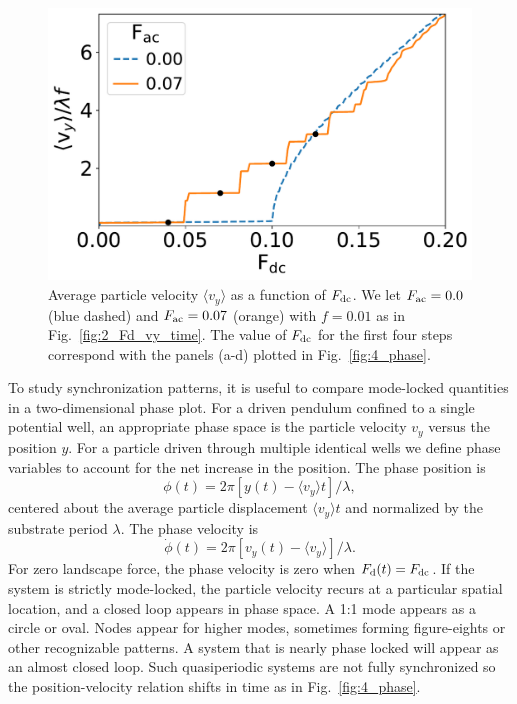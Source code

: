 \documentclass[preprint,showpacs,preprintnumbers,amsmath,amssymb,aps,prb]{revtex4-1}
\theoremstyle{remark}
\begin{document}
\begin{figure}[h]
\centering
\includegraphics[width=\columnwidth]{fig3_sweep_vyFDC.pdf}
\caption{Average particle velocity  $\langle v_{y} \rangle$
  as a function of $F_{\rm dc}$.
  We let
  $F_{\rm ac}=0.0$ (blue dashed) and 
  $F_{\rm ac}=0.07$ (orange) with $f = 0.01$ 
  as in Fig.~\ref{fig:2_Fd_vy_time}.
  The value of $F_{\rm dc}$ for the first four steps
  correspond with the
  panels (a-d) 
  plotted in Fig.~\ref{fig:4_phase}.
}
\label{fig:3_sweep_vyFDC}
\end{figure}

  To study synchronization patterns, 
  it is useful to compare
  mode-locked quantities 
  in a two-dimensional phase plot. 
  For a driven pendulum confined to a single potential well,
  an appropriate
  phase space is the particle velocity $v_y$ versus the position $y$.  
  For a particle driven 
  through multiple identical wells 
  we define phase variables 
  to account for the net increase in the position.
  The phase position is
  \begin{equation}
    \phi(t) = 2\pi [y(t)-\langle v_y \rangle t]/\lambda,
  \end{equation}
  centered about the average particle displacement $\langle v_y \rangle t$
  and normalized by the substrate period $\lambda$.\cite{Juniper2015}
  The phase velocity is
  \begin{equation}
    \dot{\phi}(t) =2\pi [v_y(t)-\langle v_y \rangle] /\lambda.  
  \end{equation}
  For zero landscape force, 
  the phase velocity  is zero when $F_{\rm d}(t) = F_{\rm dc}$.
  If the system
  is strictly mode-locked,
  the particle velocity
  recurs at a particular spatial location, and 
  a closed loop appears in  
  phase space. 
  A 1:1 mode appears as a circle or oval. 
  Nodes appear 
  for higher modes,
  sometimes forming figure-eights
  or other recognizable patterns.
  A system that is nearly phase locked
  will appear as an almost closed loop.
  Such quasiperiodic systems are
  not fully synchronized
  so the position-velocity relation
  shifts in time as in Fig.~\ref{fig:4_phase}.
  
\end{document}
